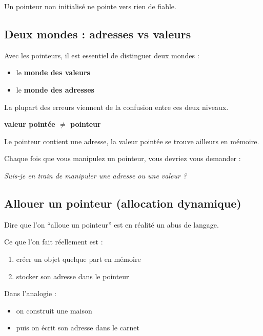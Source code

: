 Un pointeur non initialisé ne pointe vers rien de fiable.

\subsection{Deux mondes : adresses vs valeurs}

Avec les pointeurs, il est essentiel de distinguer deux mondes :

\begin{itemize}
    \item le \textbf{monde des valeurs}
    \item le \textbf{monde des adresses}
\end{itemize}

La plupart des erreurs viennent de la confusion entre ces deux niveaux.

\begin{center}
\textbf{valeur pointée $\neq$ pointeur}
\end{center}

Le pointeur contient une adresse,
la valeur pointée se trouve ailleurs en mémoire.

Chaque fois que vous manipulez un pointeur,
vous devriez vous demander :

\begin{center}
\textit{Suis-je en train de manipuler une adresse ou une valeur ?}
\end{center}

\subsection{Allouer un pointeur (allocation dynamique)}

Dire que l’on ``alloue un pointeur'' est en réalité un abus de langage.

Ce que l’on fait réellement est :

\begin{enumerate}
    \item créer un objet quelque part en mémoire
    \item stocker son adresse dans le pointeur
\end{enumerate}

Dans l’analogie :

\begin{itemize}
    \item on construit une maison
    \item puis on écrit son adresse dans le carnet
\end{itemize}

